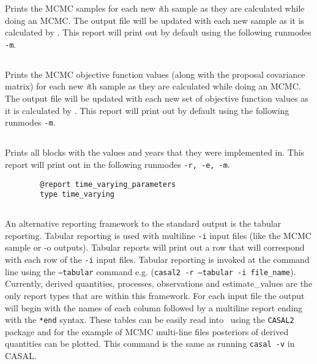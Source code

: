 Prints the MCMC samples for each new \textit{i}th sample as they are calculated while doing an MCMC. The output file will be updated with each new sample as it is calculated by \CNAME. This report will print out by default using the following runmodes \texttt{-m}.

\subsection{}

Prints the MCMC objective function values (along with the proposal covariance matrix) for each new \textit{i}th sample as they are calculated while doing an MCMC. The output file will be updated with each new set of objective function values as it is calculated by \CNAME. This report will print out by default using the following runmodes \texttt{-m}.

\subsection{}

Prints all  blocks with the values and years that they were implemented in. This report will print out in the following runmodes \texttt{-r, -e, -m}.

{\small{\begin{verbatim}
		@report time_varying_parameters
		type time_varying
		\end{verbatim}}}

\subsection{}\label{sub:tabular}
An alternative reporting framework to the standard output is the tabular reporting. Tabular reporting is used with multiline \texttt{-i} input files (like the MCMC sample or -o outputs). Tabular reports will print out a row that will correspond with each row of the \texttt{-i} input files. Tabular reporting is invoked at the command line using the \texttt{--tabular} command e.g. (\texttt{casal2 -r --tabular -i file\_name}). Currently, derived quantities, processes, observations and estimate\_values are the only report types that are within this framework. For each input file the output will begin with the names of each column followed by a multiline report ending with the \texttt{*end} syntax. These tables can be easily read into \R\ using the \texttt{CASAL2} package and for the example of MCMC multi-line files posteriors of derived quantities can be plotted. This command is the same as running \texttt{casal -v} in CASAL.


